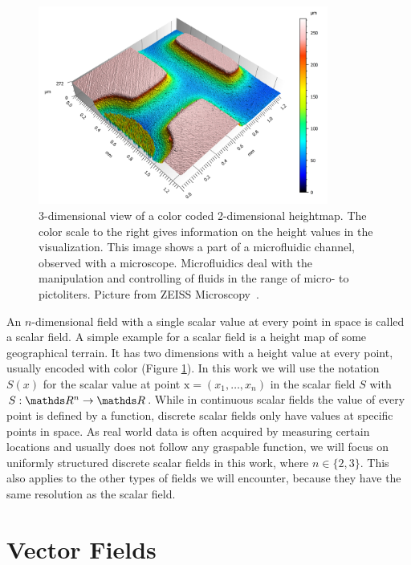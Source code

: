\begin{figure}
  \centering
  \includegraphics[width=0.85\textwidth]{Images/microfluid.png}
  \caption{3-dimensional view of a color coded 2-dimensional heightmap.
  The color scale to the right gives information on the height values in
  the visualization. This image shows a part of a microfluidic channel,
  observed with a microscope. Microfluidics deal with the manipulation
  and controlling of fluids in the range of micro- to pictoliters.
  Picture from ZEISS Microscopy~\cite{HM}.}
  \label{fig:HM}
\end{figure}

An $n$-dimensional field with a single scalar value at every point in
space is called a scalar field. A simple example for a scalar field is a
height map of some geographical terrain. It has two dimensions with a
height value at every point, usually encoded with color (Figure
\ref{fig:HM}). In this work we will use the notation $S(x)$ for the
scalar value at point $\text{x} = (x_1,\dots,x_n)$ in the scalar field $S$ with
$S: \real^n \rightarrow \real$. While in continuous scalar fields the
value of every point is defined by a function, discrete scalar fields
only have values at specific points in space. As real world data is
often acquired by measuring certain locations and usually does not
follow any graspable function, we will focus on uniformly structured
discrete scalar fields in this work, where $n \in \{2,3\}$. This also
applies to the other types of fields we will encounter, because they
have the same resolution as the scalar field.

\section{Vector Fields}

